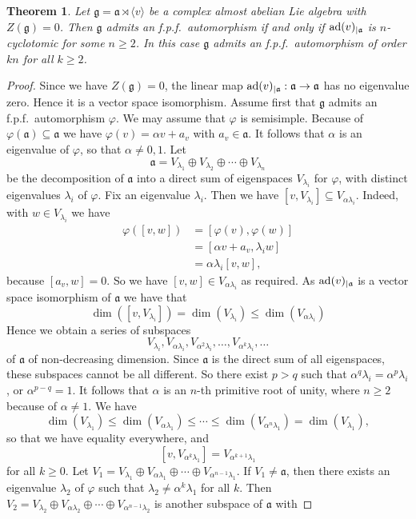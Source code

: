 \documentclass[12pt]{amsart}
\newtheorem{thm}{Theorem}[section]
\theoremstyle{definition}
\theoremstyle{remark}
\newcommand{\ad}{{\rm ad}}
\newcommand{\La}{\mathfrak{a}}
\newcommand{\Lg}{\mathfrak{g}}
\newcommand{\al}{\alpha}
\newcommand{\la}{\lambda}
\newcommand{\ra}{\rightarrow}
\renewcommand{\phi}{\varphi}
\begin{document}
\begin{thm}\label{5.4}
Let $\Lg=\La\rtimes \langle v\rangle$ be a complex almost abelian Lie algebra with $Z(\Lg)=0$. Then
$\Lg$ admits an f.p.f.\ automorphism if and only if $\ad(v)_{\mid \La}$ is $n$-cyclotomic for some
$n\ge 2$. In this case $\Lg$ admits an f.p.f.\ automorphism of order $kn$ for all $k\ge 2$.
\end{thm}  

\begin{proof}
Since we have $Z(\Lg)=0$, the linear map $\ad(v)_{\mid \La}: \La\ra \La$ has no eigenvalue zero. Hence it is a
vector space isomorphism. Assume first that $\Lg$ admits an f.p.f.\ automorphism $\phi$. We may assume that $\phi$
is semisimple. Because of $\phi(\La)\subseteq \La$ we have $\phi(v)=\al v+a_v$ with $a_v\in \La$.
It follows that $\al$ is an eigenvalue of $\phi$, so that $\al\neq 0,1$. Let
\[
\La=V_{\la_1}\oplus V_{\la_2}\oplus \cdots \oplus V_{\la_n}
\]
be the decomposition of $\La$ into a direct sum of eigenspaces $V_{\la_i}$ for $\phi$, with distinct eigenvalues
$\la_i$ of $\phi$. Fix an eigenvalue $\la_i$. Then we have $[v,V_{\la_i}]\subseteq V_{\al\la_i}$. Indeed, with
$w\in V_{\la_i}$ we have
\begin{align*}
\phi([v,w]) & =[\phi(v),\phi(w)] \\
            & = [\al v +a_v, \la_i w] \\
            & = \al\la_i[v,w],
\end{align*}
because $[a_v,w]=0$. So we have $[v,w]\in V_{\al\la_i}$ as required. As $\ad(v)_{\mid \La}$ is a vector space
isomorphism of $\La$ we have that
\[
\dim ([v,V_{\la_i}])=\dim (V_{\la_i})\le \dim (V_{\al\la_i})
\]
Hence we obtain a series of subspaces
\[
V_{\la_i}, V_{\al\la_i}, V_{\al^2\la_i},\ldots , V_{\al^k\la_i}, \ldots
\]
of $\La$ of non-decreasing dimension. Since $\La$ is the direct sum of all eigenspaces, these
subspaces cannot be all different. So there exist $p>q$ such that $\al^q\la_i=\al^p\la_i$, or
$\al^{p-q}=1$. It follows that $\al$ is an $n$-th primitive root of unity, where $n\ge 2$ because of $\al\neq 1$.
We have
\[
\dim (V_{\la_1})\le \dim (V_{\al\la_1})\le \cdots \le \dim (V_{\al^n\la_1})=\dim (V_{\la_1}),
\]  
so that we have equality everywhere, and
\[
[v,V_{\al^k\la_1}]=V_{\al^{k+1}\la_1}
\]
for all $k\ge 0$. Let $V_1=V_{\la_1}\oplus V_{\al\la_1}\oplus \cdots \oplus V_{\al^{n-1}\la_1}$. If $V_1\neq \La$,
then there exists an eigenvalue $\la_2$ of $\phi$ such that $\la_2\neq \al^k\la_1$ for all $k$. Then
$V_2=V_{\la_2}\oplus V_{\al\la_2}\oplus \cdots \oplus V_{\al^{n-1}\la_2}$ is another subspace of $\La$ with

\end{proof}
\end{document}
